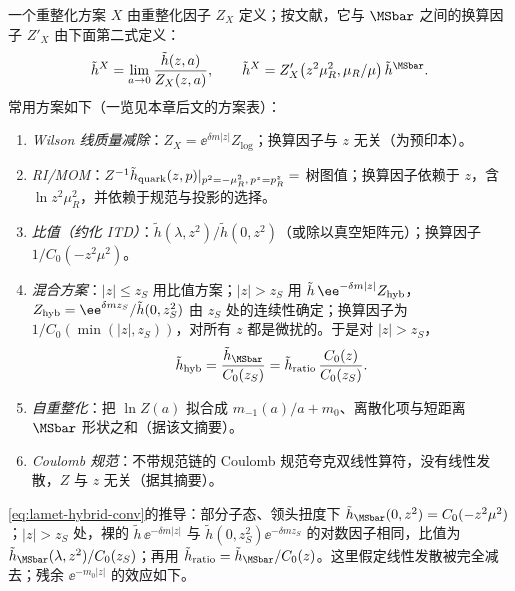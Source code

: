 \begin{definition}[准关联函数的重整化方案]\label{def:lamet-schemes}
一个重整化方案 $X$ 由重整化因子 $Z_X$ 定义；按文献\cite{IzubuchiEtAl2018}，它与 $\MSbar$ 之间的换算因子 $Z'_X$ 由下面第二式定义：
\[
\tilde h^X=\lim_{a\to0}\frac{\tilde h(z,a)}{Z_X(z,a)},\qquad \tilde h^X=Z'_X\big(z^2\mu_R^2,\mu_R/\mu\big)\,\tilde h^{\MSbar}.
\]
常用方案如下（一览见本章后文的方案表）：
\begin{enumerate}[label=(\roman*),leftmargin=2em,itemsep=1pt,topsep=2pt]
\item \emph{Wilson 线质量减除}：$Z_X=\ee^{\delta m|z|}Z_{\log}$；换算因子与 $z$ 无关\cite{Chen:2016fxx,Ishikawa:2016znu,Green:2017xeu}（\cite{Ishikawa:2016znu}为预印本）。
\item \emph{RI/MOM}：$Z^{-1}\tilde h_{\rm quark}(z,p)|_{p^2=-\mu_R^2,\,p^z=p^z_R}=$ 树图值；换算因子依赖于 $z$，含 $\ln z^2\mu_R^2$，并依赖于规范与投影的选择\cite{Constantinou:2017sej,Stewart:2017tvs,Alexandrou:2017huk,Chen:2017mzz,LatticeParton:2018gjr}。
\item \emph{比值（约化 ITD）}：$\tilde h(\lambda,z^2)/\tilde h(0,z^2)$（或除以真空矩阵元）；换算因子 $1/C_0(-z^2\mu^2)$\cite{Radyushkin2017,Orginos:2017kos,Braun:2018brg}。
\item \emph{混合方案}：$|z|\le z_S$ 用比值方案；$|z|>z_S$ 用 $\tilde h\,\ee^{-\delta m|z|}Z_{\rm hyb}$，$Z_{\rm hyb}=\ee^{\delta mz_S}/\tilde h(0,z_S^2)$ 由 $z_S$ 处的连续性确定；换算因子为 $1/C_0(\min(|z|,z_S))$，对所有 $z$ 都是微扰的\cite{Ji:2020brr}。于是对 $|z|>z_S$，
\begin{equation}\label{eq:lamet-hybrid-conv}
\tilde h_{\rm hyb}=\frac{\tilde h_{\MSbar}}{C_0(z_S)}=\tilde h_{\rm ratio}\,\frac{C_0(z)}{C_0(z_S)} .
\end{equation}%
\item \emph{自重整化}：把 $\ln Z(a)$ 拟合成 $m_{-1}(a)/a+m_0$、离散化项与短距离 $\MSbar$ 形状之和\cite{LatticePartonLPC:2021gpi}（据该文摘要）。
\item \emph{Coulomb 规范}：不带规范链的 Coulomb 规范夸克双线性算符，没有线性发散，$Z$ 与 $z$ 无关\cite{Gao:2023lny,Zhao:2023ptv}（据其摘要）。
\end{enumerate}
\end{definition}

\cref{eq:lamet-hybrid-conv}的推导：部分子态、领头扭度下 $\tilde h_{\MSbar}(0,z^2)=C_0(-z^2\mu^2)$；$|z|>z_S$ 处，裸的 $\tilde h\,\ee^{-\delta m|z|}$ 与 $\tilde h(0,z_S^2)\ee^{-\delta mz_S}$ 的对数因子相同，比值为 $\tilde h_{\MSbar}(\lambda,z^2)/C_0(z_S)$；再用 $\tilde h_{\rm ratio}=\tilde h_{\MSbar}/C_0(z)$。这里假定线性发散被完全减去；残余 $\ee^{-m_0|z|}$ 的效应如下。

